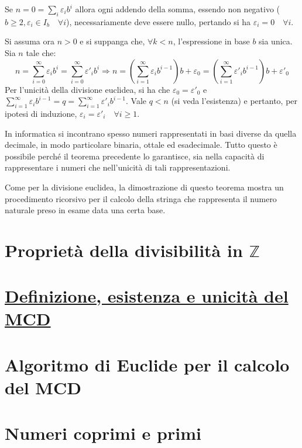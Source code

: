 \documentclass[oneside]{book}
\begin{document}
\begin{tcolorbox}[enhanced, breakable, title={Teorema di rappresentazione dei naturali in base arbitraria}]
Se $n = 0 = \sum_{i} \varepsilon_i b^i$ allora ogni addendo della somma,
essendo non negativo ($b \geq 2, \varepsilon_i \in I_b \quad \forall i$), necessariamente deve essere nullo, pertando si
ha $\varepsilon_i = 0 \quad \forall i$.

Si assuma ora $n > 0$ e si suppanga che, $\forall k < n$, l'espressione
in base $b$ sia unica. Sia $n$ tale che:
\[
    n = \sum_{i=0}^{\infty}\varepsilon_i b^i = \sum_{i=0}^{\infty}\varepsilon'_i b^i \Longrightarrow
    n = \left(\sum_{i=1}^{\infty}\varepsilon_i b^{i-1}\right)b + \varepsilon_0 = \left(\sum_{i=1}^{\infty}\varepsilon'_i b^{i-1}\right)b + \varepsilon'_0
\]
Per l'unicità della divisione euclidea, si ha che $\varepsilon_0 = \varepsilon'_0$
e $\sum_{i=1}^{\infty}\varepsilon_i b^{i-1} = q = \sum_{i=1}^{\infty}\varepsilon'_i b^{i-1}$.
Vale $q < n$ (si veda l'esistenza) e pertanto, per ipotesi di induzione,
$\varepsilon_i = \varepsilon'_i \quad \forall i \geq 1$.
\cvd
\end{tcolorbox}
In informatica si incontrano spesso numeri rappresentati in basi
diverse da quella decimale, in modo particolare binaria, ottale
ed esadecimale. Tutto questo è possibile perché il teorema precedente
lo garantisce, sia nella capacità di rappresentare i numeri che
nell'unicità di tali rappresentazioni.

Come per la divisione euclidea, la dimostrazione di questo teorema
mostra un procedimento ricorsivo per il calcolo della stringa che
rappresenta il numero naturale preso in esame data una certa base.

\begin{tcolorbox}[enhanced, breakable, colback=red!30, colframe=red!30!black, title = {Algoritmo di conversione tra rappresentabilità dei naturali in basi diverse}]

\end{tcolorbox}


\section{Proprietà della divisibilità in $\mathbb{Z}$}
\section{\underline{Definizione, esistenza e unicità del MCD}}
\section{Algoritmo di Euclide per il calcolo del MCD}
\section{Numeri coprimi e primi}
\end{document}
